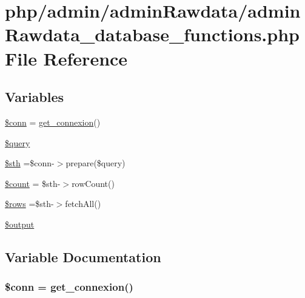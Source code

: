 \hypertarget{admin_rawdata_2admin_rawdata__database__functions_8php}{\section{php/admin/admin\-Rawdata/admin\-Rawdata\-\_\-database\-\_\-functions.php File Reference}
\label{admin_rawdata_2admin_rawdata__database__functions_8php}
}
\subsection*{Variables}
\begin{DoxyCompactItemize}
\item 
\hyperlink{admin_rawdata_2admin_rawdata__database__functions_8php_aa8a5a87b9c1a6a0819b88447cbe41877}{\$conn} = \hyperlink{php__functions_8php_ace18bc10f3fd08f92688ac743e0d8c2e}{get\-\_\-connexion}()
\item 
\hyperlink{admin_rawdata_2admin_rawdata__database__functions_8php_af59a5f7cd609e592c41dc3643efd3c98}{\$query}
\item 
\hyperlink{admin_rawdata_2admin_rawdata__database__functions_8php_afa9126f9664959c02795be300a135f93}{\$sth} =\$conn-\/$>$prepare(\$query)
\item 
\hyperlink{admin_rawdata_2admin_rawdata__database__functions_8php_af789423037bbc89dc7c850e761177570}{\$count} = \$sth-\/$>$row\-Count()
\item 
\hyperlink{admin_rawdata_2admin_rawdata__database__functions_8php_ace2ec39e7df3899fa8df9640ec274b03}{\$rows} =\$sth-\/$>$fetch\-All()
\item 
\hyperlink{admin_rawdata_2admin_rawdata__database__functions_8php_a73004ce9cd673c1bfafd1dc351134797}{\$output}
\end{DoxyCompactItemize}


\subsection{Variable Documentation}
\hypertarget{admin_rawdata_2admin_rawdata__database__functions_8php_aa8a5a87b9c1a6a0819b88447cbe41877}{
\subsubsection[{\$conn}]{\setlength{\rightskip}{0pt plus 5cm}\$conn = {\bf get\-\_\-connexion}()}}\label{admin_rawdata_2admin_rawdata__database__functions_8php_aa8a5a87b9c1a6a0819b88447cbe41877}


